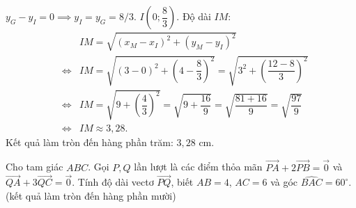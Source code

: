 \begin{ex}
{	$y_G - y_I = 0 \implies y_I = y_G = 8/3$.
	$I\left(0; \dfrac{8}{3}\right)$.
	Độ dài $IM$:
	\begin{eqnarray*}
		& & IM = \sqrt{(x_M - x_I)^2 + (y_M - y_I)^2}\\
		&\Leftrightarrow & IM = \sqrt{(3 - 0)^2 + \left(4 - \dfrac{8}{3}\right)^2} = \sqrt{3^2 + \left(\dfrac{12-8}{3}\right)^2}\\
		&\Leftrightarrow & IM = \sqrt{9 + \left(\dfrac{4}{3}\right)^2} = \sqrt{9 + \dfrac{16}{9}} = \sqrt{\dfrac{81+16}{9}} = \sqrt{\dfrac{97}{9}}\\
		&\Leftrightarrow & IM \approx 3{,}28.
	\end{eqnarray*}
	Kết quả làm tròn đến hàng phần trăm: $3{,}28$ cm.
	}
\end{ex}
\begin{ex}%
	Cho tam giác $ABC$. Gọi $P, Q$ lần lượt là các điểm thỏa mãn $\overrightarrow{PA}+2\overrightarrow{PB}=\overrightarrow{0}$ và $\overrightarrow{QA}+3\overrightarrow{QC}=\overrightarrow{0}$. Tính độ dài vectơ $\overrightarrow{PQ}$, biết $AB=4$, $AC=6$ và góc $\widehat{BAC}=60^\circ$. (kết quả làm tròn đến hàng phần mười)
\end{ex}
